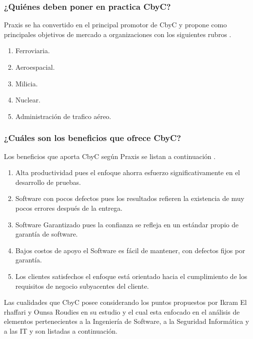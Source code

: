 \documentclass[runningheads,a4paper]{llncs}
\begin{document}
\subsubsection{¿Quiénes deben poner en practica \gls{CbyC}?}
\gls{Praxis} se ha convertido en el principal promotor de \gls{CbyC} y propone como principales objetivos de mercado a organizaciones con los siguientes rubros \cite{CbyCPraxis}.

\begin{enumerate}
	\item Ferroviaria. 
	\item Aeroespacial.
	\item Milicia.
	\item Nuclear.
	\item Administración de trafico aéreo.
\end{enumerate}


\subsubsection{¿Cuáles son los beneficios que ofrece \gls{CbyC}?}
Los beneficios que aporta \gls{CbyC} según \gls{Praxis} se listan a continuación \cite{CbyCHighIntegritySystems}.

\begin{enumerate}
	\item Alta productividad pues el enfoque ahorra esfuerzo significativamente en el desarrollo de pruebas.
	\item \gls{Software} con pocos defectos pues los resultados refieren la existencia de muy pocos errores después de la entrega.
	\item \gls{Software} Garantizado pues la confianza se refleja en un estándar propio de garantía de software.
	\item Bajos costos de apoyo el \gls{Software} es fácil de mantener, con defectos fijos por garantía.
	\item Los clientes satisfechos el enfoque está orientado hacia el cumplimiento de los requisitos de negocio subyacentes del cliente.
\end{enumerate}

Las cualidades que \gls{CbyC} posee considerando los puntos propuestos por Ikram El rhaffari y Ounsa Roudies en su estudio y el cual esta enfocado en el análisis de elementos pertenecientes a la Ingeniería de \gls{Software}, a la Seguridad Informática y a las \gls{IT} y son listadas a continuación.  
\end{document}
